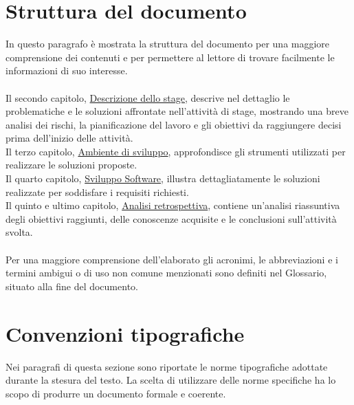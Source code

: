 \section{Struttura del documento}

In questo paragrafo è mostrata la struttura del documento per una maggiore comprensione dei contenuti e per permettere al lettore di trovare facilmente le informazioni di suo interesse.
\\
\\
Il secondo capitolo, {\hyperref[cap:descrizione-stage]{Descrizione dello stage}}, descrive nel dettaglio le problematiche e le soluzioni affrontate nell'attività di stage, mostrando una breve analisi dei rischi, la pianificazione del lavoro e gli obiettivi da raggiungere decisi prima dell'inizio delle attività.
\\
Il terzo capitolo, {\hyperref[cap:ambiente-sviluppo]{Ambiente di sviluppo}}, approfondisce gli strumenti utilizzati per realizzare le soluzioni proposte.
\\ 
Il quarto capitolo, {\hyperref[cap:sviluppo-software]{Sviluppo Software}}, illustra dettagliatamente le soluzioni realizzate per soddisfare i requisiti richiesti.
\\ 
Il quinto e ultimo capitolo, {\hyperref[cap:analisi-retrospettiva]{Analisi retrospettiva}}, contiene un'analisi riassuntiva degli obiettivi raggiunti, delle conoscenze acquisite e le conclusioni sull'attività svolta.
\\
\\
Per una maggiore comprensione dell'elaborato gli acronimi, le abbreviazioni e i termini ambigui o di uso non comune menzionati sono definiti nel Glossario, situato alla fine del documento.


\section{Convenzioni tipografiche}

Nei paragrafi di questa sezione sono riportate le norme tipografiche adottate durante la stesura del testo. La scelta di utilizzare delle norme specifiche ha lo scopo di produrre un documento formale e coerente.

